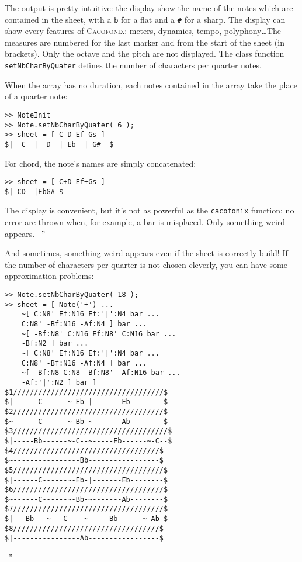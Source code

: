 \documentclass{article}
\newcommand{\cacofonix}{\textsc{Cacofonix}\xspace}
\newenvironment{meenv}{ \par \noindent \makebox[6em][r]{ \textcolor{mecolor}{Me}: `` --~}}{~''}
\newenvironment{myselfenv}{ \par \noindent \makebox[6em][r]{ \textcolor{myselfcolor}{Myself}: `` --~}}{~''}
\begin{document}
The output is pretty intuitive: the display show the name of the notes which are contained in the sheet, with a \lstinline!b! for a flat and a \lstinline!#! for a sharp. The display can show every features of \cacofonix: meters, dynamics, tempo, polyphony\dots The measures are numbered for the last marker and from the start of the sheet (in brackets). Only the octave and the pitch are not displayed. The class function \lstinline!setNbCharByQuater! defines the number of characters per quarter notes.

When the array has no duration, each notes contained in the array take the place of a quarter note:
\begin{lstlisting}
>> NoteInit
>> Note.setNbCharByQuater( 6 );
>> sheet = [ C D Ef Gs ]
$|  C  |  D  | Eb  | G#  $
\end{lstlisting}

For chord, the note's names are simply concatenated:
\begin{lstlisting}
>> sheet = [ C+D Ef+Gs ]
$| CD  |EbG# $
\end{lstlisting}

\begin{myselfenv}%
The display is convenient, but it's not as powerful as the \lstinline!cacofonix! function: no error are thrown when, for example, a bar is misplaced. Only something weird appears.%
\end{myselfenv}
\begin{meenv}
And sometimes, something weird appears even if the sheet is correctly build! If the number of characters per quarter is not chosen cleverly, you can have some approximation problems:
\begin{lstlisting}
>> Note.setNbCharByQuater( 18 );
>> sheet = [ Note('+') ...
	~[ C:N8' Ef:N16 Ef:'|':N4 bar ...
	C:N8' -Bf:N16 -Af:N4 ] bar ...
	~[ -Bf:N8' C:N16 Ef:N8' C:N16 bar ...
	-Bf:N2 ] bar ...
	~[ C:N8' Ef:N16 Ef:'|':N4 bar ...
	C:N8' -Bf:N16 -Af:N4 ] bar ...
	~[ -Bf:N8 C:N8 -Bf:N8' -Af:N16 bar ...
	-Af:'|':N2 ] bar ]
$1////////////////////////////////////$
$|------C------~-Eb-|-------Eb--------$
$2////////////////////////////////////$
$~------C------~-Bb-~-------Ab--------$
$3/////////////////////////////////////$
$|-----Bb------~-C--~-----Eb------~-C--$
$4///////////////////////////////////$
$~----------------Bb-----------------$
$5////////////////////////////////////$
$|------C------~-Eb-|-------Eb--------$
$6////////////////////////////////////$
$~------C------~-Bb-~-------Ab--------$
$7////////////////////////////////////$
$|---Bb---~---C----~-----Bb------~-Ab-$
$8///////////////////////////////////$
$|----------------Ab-----------------$
\end{lstlisting}
\end{meenv}
\end{document}
